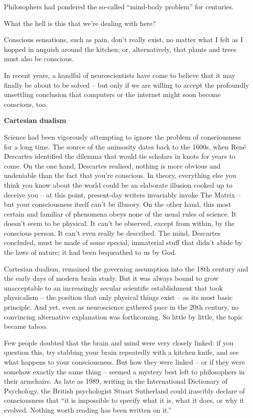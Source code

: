 \documentclass[
]{book}
\begin{document}
Philosophers had pondered the so-called ``mind-body problem'' for centuries.

What the hell is this that we're dealing with here?

Conscious sensations, such as pain, don't really exist, no matter what I felt as I hopped in anguish around the kitchen; or, alternatively, that plants and trees must also be conscious.

In recent years, a handful of neuroscientists have come to believe that it may finally be about to be solved -- but only if we are willing to accept the profoundly unsettling conclusion that computers or the internet might soon become conscious, too.

\textbf{Cartesian dualism}

Science had been vigorously attempting to ignore the problem of consciousness for a long time. The source of the animosity dates back to the 1600s, when René Descartes identified the dilemma that would tie scholars in knots for years to come. On the one hand, Descartes realised, nothing is more obvious and undeniable than the fact that you're conscious. In theory, everything else you think you know about the world could be an elaborate illusion cooked up to deceive you -- at this point, present-day writers invariably invoke The Matrix -- but your consciousness itself can't be illusory. On the other hand, this most certain and familiar of phenomena obeys none of the usual rules of science. It doesn't seem to be physical. It can't be observed, except from within, by the conscious person. It can't even really be described. The mind, Descartes concluded, must be made of some special, immaterial stuff that didn't abide by the laws of nature; it had been bequeathed to us by God.

Cartesian dualism, remained the governing assumption into the 18th century and the early days of modern brain study. But it was always bound to grow unacceptable to an increasingly secular scientific establishment that took physicalism -- the position that only physical things exist -- as its most basic principle. And yet, even as neuroscience gathered pace in the 20th century, no convincing alternative explanation was forthcoming. So little by little, the topic became taboo.

Few people doubted that the brain and mind were very closely linked: if you question this, try stabbing your brain repeatedly with a kitchen knife, and see what happens to your consciousness. But how they were linked -- or if they were somehow exactly the same thing -- seemed a mystery best left to philosophers in their armchairs. As late as 1989, writing in the International Dictionary of Psychology, the British psychologist Stuart Sutherland could irascibly declare of consciousness that ``it is impossible to specify what it is, what it does, or why it evolved. Nothing worth reading has been written on it.''
\end{document}
